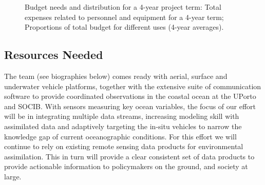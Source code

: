 \begin{figure}[!h]
  \centering
  \caption{Budget needs and distribution for a 4-year project term:
     Total expenses related to personnel and
    equipment for a 4-year term;  Proportions of
    total budget for different uses (4-year averages).}
  \label{fig:costs}
  \vspace{-0.5cm}
\end{figure}

\subsection{Resources Needed}

The \pro team (see biographies below) comes ready with aerial, surface
and underwater vehicle platforms, together with the extensive suite of
communication software to provide coordinated observations in the
coastal ocean at the UPorto and SOCIB. With sensors measuring key
ocean variables, the focus of our effort will be in integrating
multiple data streams, increasing modeling skill with assimilated data
and adaptively targeting the in-situ vehicles to narrow the knowledge
gap of current oceanographic conditions. For this effort we will
continue to rely on existing remote sensing data products for
environmental assimilation. This in turn will provide a clear
consistent set of data products to provide actionable information to
policymakers on the ground, and society at large.

